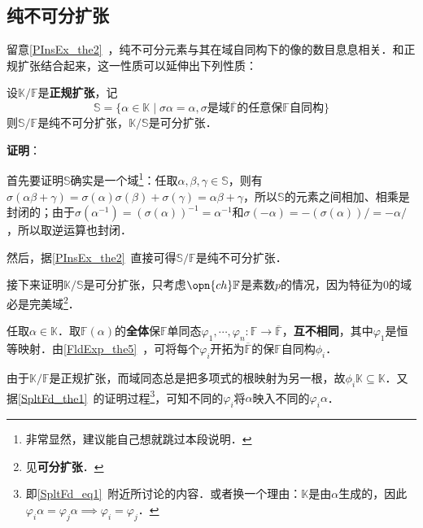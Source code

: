 \subsection{纯不可分扩张}


留意\autoref{PInsEx_the2}~，纯不可分元素与其在域自同构下的像的数目息息相关．和正规扩张结合起来，这一性质可以延伸出下列性质：

\begin{theorem}{}\label{NomEx_the5}
设$\mathbb{K}/\mathbb{F}$是\textbf{正规扩张}，记
\begin{equation}\label{NomEx_eq1}
\mathbb{S}=\{\alpha\in\mathbb{K}\mid \sigma\alpha = \alpha, \sigma\text{是域}\overline{\mathbb{F}}\text{的任意保}\mathbb{F}\text{自同构}\}
\end{equation}
则$\mathbb{S}/\mathbb{F}$是纯不可分扩张，$\mathbb{K}/\mathbb{S}$是可分扩张．
\end{theorem}

\textbf{证明}：

首先要证明$\mathbb{S}$确实是一个域\footnote{非常显然，建议能自己想就跳过本段说明．}：任取$\alpha, \beta, \gamma\in\mathbb{S}$，则有$\sigma(\alpha\beta+\gamma)=\sigma(\alpha)\sigma(\beta)+\sigma(\gamma)=\alpha\beta+\gamma$，所以$\mathbb{S}$的元素之间相加、相乘是封闭的；由于$\sigma(\alpha^{-1})=(\sigma(\alpha))^{-1}=\alpha^{-1}$和$\sigma(-\alpha)=-(\sigma(\alpha))/=-\alpha/$，所以取逆运算也封闭．

然后，据\autoref{PInsEx_the2}~直接可得$\mathbb{S}/\mathbb{F}$是纯不可分扩张．

接下来证明$\mathbb{K}/\mathbb{S}$是可分扩张，只考虑$\opn{ch}\mathbb{F}$是素数$p$的情况，因为特征为$0$的域必是完美域\footnote{见\textbf{可分扩张}．}．

任取$\alpha\in\mathbb{K}$．取$\mathbb{F}(\alpha)$的\textbf{全体}保$\mathbb{F}$单同态$\varphi_1, \cdots, \varphi_n:\mathbb{F}\to\overline{\mathbb{F}}$，\textbf{互不相同}，其中$\varphi_1$是恒等映射．由\autoref{FldExp_the5}~，可将每个$\varphi_i$开拓为$\overline{\mathbb{F}}$的保$\mathbb{F}$自同构$\phi_i$．

由于$\mathbb{K}/\mathbb{F}$是正规扩张，而域同态总是把多项式的根映射为另一根，故$\phi_i\mathbb{K}\subseteq\mathbb{K}$．又据\autoref{SpltFd_the1}~的证明过程\footnote{即\autoref{SpltFd_eq1}~附近所讨论的内容．或者换一个理由：$\mathbb{K}$是由$\alpha$生成的，因此$\varphi_i\alpha=\varphi_j\alpha\implies \varphi_i=\varphi_j$．}，可知不同的$\varphi_i$将$\alpha$映入不同的$\varphi_i\alpha$．

